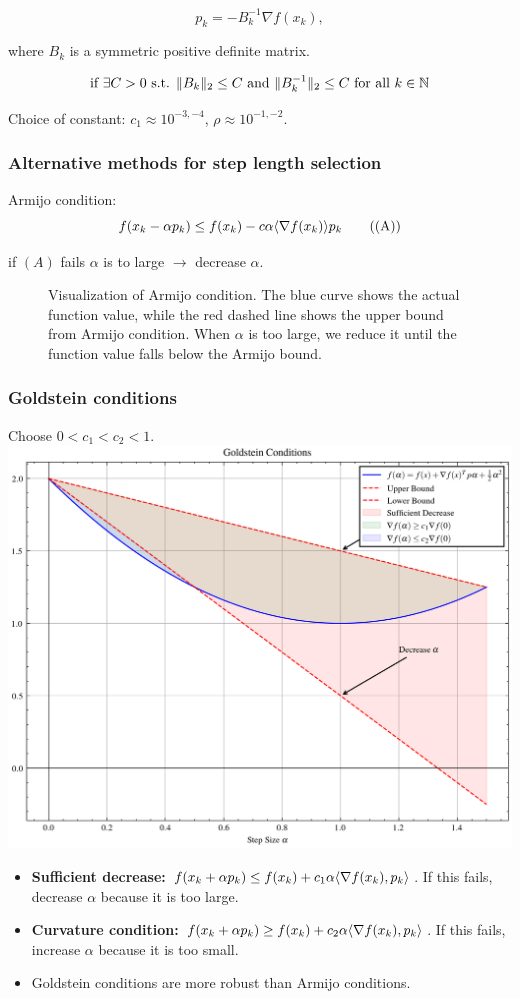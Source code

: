 \[
  p_k = - B_k^{-1} \nabla f(x_k),
\]

where  \(B_k\) is a symmetric positive definite matrix.

\[
  \text{if } \exists C > 0 \text{ s.t. } \lVert B_k\rVert_2 \leq C \text{ and } \lVert B_k^{-1}\rVert_2 \leq C \text{ for all } k \in \mathbb{N}
\]

Choice of constant:  \(c_1 \approx 10^{-3,-4}\),  \(\rho \approx 10^{-1,-2}\).

\subsubsection*{Alternative methods for step length selection}

Armijo condition:
\[
  f(x_k - \alpha p_k) \leq f(x_k) - c \alpha \langle\nabla f(x_k)\rangle{p_k} \tag{(A)}
\]

if  \((A)\) fails  \(\alpha\) is to large  \(\to\) decrease  \(\alpha\).

\begin{figure}[H]
  \centering
  \caption{Visualization of Armijo condition. The blue curve shows the actual function value, while the red dashed line shows the upper bound from Armijo condition. When  \(\alpha\) is too large, we reduce it until the function value falls below the Armijo bound.}
\end{figure}

\subsubsection*{Goldstein conditions}
Choose  \(0 < c_1 < c_2 < 1\).
\includegraphics[scale=0.5]{figures/goldstein_conditions.png}
\begin{itemize}
  \item \textbf{Sufficient decrease:}  \(f(x_k + \alpha p_k) \leq f(x_k) + c_1 \alpha \langle\nabla f(x_k), p_k\rangle\). If this fails, decrease  \(\alpha\) because it is too large.
  \item \textbf{Curvature condition:}  \(f(x_k + \alpha p_k) \geq f(x_k) + c_2 \alpha \langle\nabla f(x_k), p_k\rangle\). If this fails, increase  \(\alpha\) because it is too small.
  \item Goldstein conditions are more robust than Armijo conditions.
\end{itemize}

